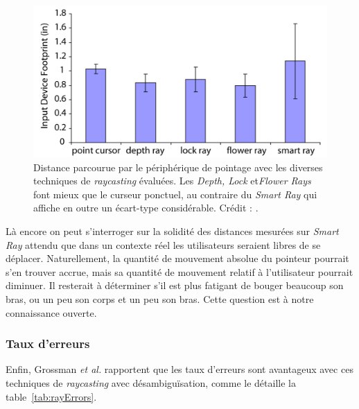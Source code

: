 	\begin{figure}[!htb]
		\centering
		\includegraphics[width=\textwidth]{figures/ch2/rayFootprint}
		\caption[\emph{Raycasting} et désambiguïsation -- distance parcourue par le périphérique]{Distance parcourue par le périphérique de pointage avec les diverses techniques de \emph{raycasting} évaluées. Les \emph{Depth, Lock} et\emph{Flower Rays} font mieux que le curseur ponctuel, au contraire du \emph{Smart Ray} qui affiche en outre un écart-type considérable. Crédit : \cite{grossman2006design}.}
		\label{fig:rayFootprint}
	\end{figure}
	
	Là encore on peut s'interroger sur la solidité des distances mesurées sur \emph{Smart Ray} attendu que dans un contexte \og réel \fg{} les utilisateurs seraient libres de se déplacer. Naturellement, la quantité de mouvement absolue du pointeur pourrait s'en trouver accrue, mais sa quantité de mouvement relatif à l'utilisateur pourrait diminuer. Il resterait à déterminer s'il est plus fatigant de bouger beaucoup son bras, ou un peu son corps et un peu son bras. Cette question est à notre connaissance ouverte.
	
	\subsubsection{Taux d'erreurs}
	Enfin, Grossman \emph{et al.} rapportent que les taux d'erreurs sont avantageux avec ces techniques de \emph{raycasting} avec désambiguïsation, comme le détaille la table~\ref{tab:rayErrors}.
	
